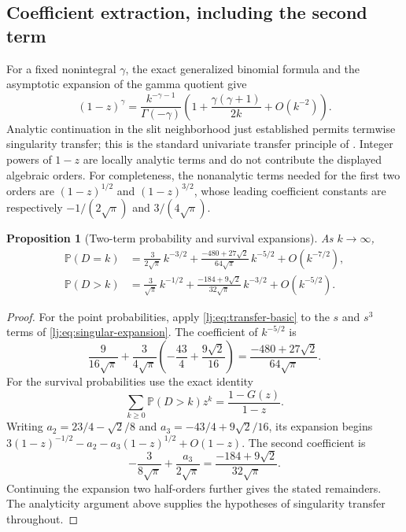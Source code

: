 \documentclass[11pt,a4paper]{article}
\newtheorem{proposition}[proposition]{Proposition}
\theoremstyle{definition}\newaliascnt{definition}{theorem}
\theoremstyle{remark}\newaliascnt{remark}{theorem}
\newcommand{\ljP}{\mathbb P}
\begin{document}
\subsection{Coefficient extraction, including the second term}
For a fixed nonintegral $\gamma$, the exact generalized binomial formula
and the asymptotic expansion of the gamma quotient give
\begin{equation}
 [z^k](1-z)^\gamma
 =\frac{k^{-\gamma-1}}{\Gamma(-\gamma)}
 \left(1+\frac{\gamma(\gamma+1)}{2k}+O(k^{-2})\right).
 \label{lj:eq:transfer-basic}
\end{equation}
Analytic continuation in the slit neighborhood just established permits
termwise singularity transfer; this is the standard univariate transfer
principle of \cite{FlajoletOdlyzko}. Integer powers of $1-z$ are locally
analytic terms and do not contribute the displayed algebraic orders.
For completeness, the nonanalytic terms needed for the first two orders
are $(1-z)^{1/2}$ and $(1-z)^{3/2}$, whose leading coefficient constants
are respectively $-1/(2\sqrt\pi)$ and $3/(4\sqrt\pi)$.

\begin{proposition}[Two-term probability and survival expansions]
\label{lj:prop:two-term}
As $k\to\infty$,
\begin{align}
 \ljP(D=k)
 &=\frac{3}{2\sqrt\pi}\,k^{-3/2}
   +\frac{-480+27\sqrt2}{64\sqrt\pi}\,k^{-5/2}
   +O(k^{-7/2}),\label{lj:eq:pmf-two}\\
 \ljP(D>k)
 &=\frac{3}{\sqrt\pi}\,k^{-1/2}
   +\frac{-184+9\sqrt2}{32\sqrt\pi}\,k^{-3/2}
   +O(k^{-5/2}).\label{lj:eq:tail-two}
\end{align}
\end{proposition}
\begin{proof}
For the point probabilities, apply \eqref{lj:eq:transfer-basic} to the $s$
and $s^3$ terms of \eqref{lj:eq:singular-expansion}. The coefficient of
$k^{-5/2}$ is
\[
 \frac{9}{16\sqrt\pi}
 +\frac3{4\sqrt\pi}
    \left(-\frac{43}{4}+\frac{9\sqrt2}{16}\right)
 =\frac{-480+27\sqrt2}{64\sqrt\pi}.
\]
For the survival probabilities use the exact identity
\begin{equation}
 \sum_{k\ge0}\ljP(D>k)z^k=\frac{1-G(z)}{1-z}.
 \label{lj:eq:tail-gf}
\end{equation}
Writing $a_2=23/4-\sqrt2/8$ and
$a_3=-43/4+9\sqrt2/16$, its expansion begins
$3(1-z)^{-1/2}-a_2-a_3(1-z)^{1/2}+O(1-z)$.
The second coefficient is
\[
 -\frac3{8\sqrt\pi}+\frac{a_3}{2\sqrt\pi}
 =\frac{-184+9\sqrt2}{32\sqrt\pi}.
\]
Continuing the expansion two half-orders further gives the stated
remainders. The analyticity argument above supplies the hypotheses of
singularity transfer throughout.
\end{proof}
\end{document}
